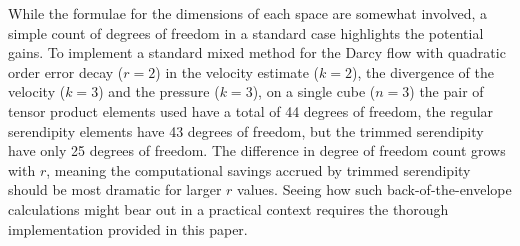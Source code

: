 \documentclass[manuscript,screen]{acmart}
\newcommand\akg[1]{\textbf{\textcolor[rgb]{.5,0,1}{[Andrew: #1]}}}
\newcommand{\calS}{\mathcal{S}}
\begin{document}
   While the formulae for the dimensions of each space are somewhat involved, a simple count of degrees of freedom in a standard case highlights the potential gains.
	To implement a standard mixed method for the Darcy flow with quadratic order error decay ($r=2$) in the velocity estimate ($k=2$), the divergence of the velocity ($k=3$) and the pressure ($k=3$), on a single cube ($n=3$) the pair of tensor product elements used have a total of 44 degrees of freedom, the regular serendipity elements have 43 degrees of freedom, but the trimmed serendipity have only 25 degrees of freedom. 
	The difference in degree of freedom count grows with $r$, meaning the computational savings accrued by trimmed serendipity should be most dramatic for larger $r$ values.
	Seeing how such back-of-the-envelope calculations might bear out in a practical context requires the thorough implementation provided in this paper.
   
   
   
   
  
\end{document}
